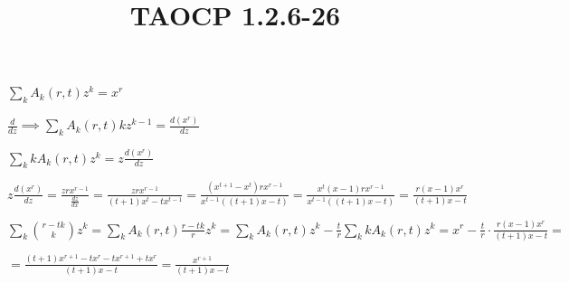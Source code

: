 \documentclass{article}
\title{TAOCP 1.2.6\mbox{-}26}
\begin{document}
\maketitle

\( \sum_{k} A_{k}(r,t)z^{k} = x^{r} \)

\( \frac{d}{dz} \implies \sum_{k} A_{k}(r,t)kz^{k-1} = \frac{d(x^{r})}{dz} \)

\( \sum_{k}kA_{k}(r,t)z^{k} = z\frac{d(x^{r})}{dz} \)

\( z\frac{d(x^{r})}{dz} = \frac{zrx^{r-1}}{\frac{dz}{dx}} = \frac{zrx^{r-1}}{(t+1)x^{t} - tx^{t-1}} = \frac{(x^{t+1}-x^{t})rx^{r-1}}{x^{t-1}((t+1)x - t)} = \frac{x^{t}(x-1)rx^{r-1}}{x^{t-1} ((t+1)x - t)} = \frac{r(x-1)x^{r}}{(t+1)x - t} \)

\( \sum_{k} \binom{r-tk}{k}z^{k} = \sum_{k} A_{k}(r, t) \frac{r-tk}{r}z^{k} = \sum_{k} A_{k}(r,t)z^{k} - \frac{t}{r} \sum_{k} kA_{k}(r,t)z^{k} = x^{r} - \frac{t}{r} \cdot \frac{r(x-1)x^{r}}{(t+1)x - t} = \)

\( = \frac{(t+1)x^{r+1} - tx^{r} - tx^{r+1} + tx^{r} }{(t+1)x-t} = \frac{x^{r+1}}{(t+1)x-t} \)
\end{document}
